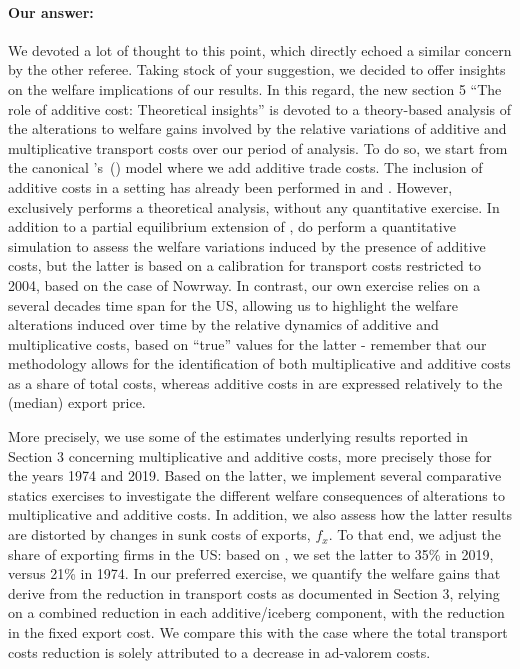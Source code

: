 \documentclass[a4paper,11pt]{article}
\newcommand\cites[1]{\citeauthor{#1}'s\ (\citeyear{#1})}
\begin{document}
\paragraph{Our answer:}
\noindent We devoted a lot of thought to this point, which directly echoed a similar concern by the other referee. Taking stock of your suggestion, we decided to offer insights on the welfare implications of our results. In this regard, the new section 5 ``The role of additive cost: Theoretical insights'' is devoted to a theory-based analysis of the alterations to welfare gains involved by the relative variations of additive and multiplicative transport costs over our period of analysis. To do so, we start from the canonical \cites{melitz} model where we add additive trade costs. The inclusion of additive costs in a \citet{melitz} setting has already been performed in \citet{sorensen2014} and \citet{Irrazabal_2015}. However, \citet{sorensen2014} exclusively performs a theoretical analysis, without any quantitative exercise. In addition to a partial equilibrium extension of \citet{melitz}, \citet{Irrazabal_2015} do perform a quantitative simulation to assess the welfare variations induced by the presence of additive costs, but the latter is based on a calibration for transport costs restricted to 2004, based on the case of Nowrway. In contrast, our own exercise relies on a several decades time span for the US, allowing us to highlight the welfare alterations induced over time by the relative dynamics of additive and multiplicative costs, based on ``true'' values for the latter - remember that our methodology allows for the identification of both multiplicative and additive costs as a share of total costs, whereas additive costs in \citet{Irrazabal_2015} are expressed relatively to the (median) export price.

More precisely, we use some of the estimates underlying results reported in Section 3 concerning multiplicative and additive costs, more precisely those for the years 1974 and 2019. Based on the latter, we implement several comparative statics exercises to investigate the different welfare consequences of alterations to multiplicative and additive costs. In addition, we also assess how the latter results are distorted by changes in sunk costs of exports, $f_{x}$. To that end, we adjust the share of exporting firms in the US: based on \citet{Lincoln_McCallum2018}, we set the latter to 35\% in 2019, versus 21\% in 1974. In our preferred exercise, we quantify the welfare gains that derive from the reduction in transport costs as documented in Section 3, relying on a combined reduction in each additive/iceberg component, with the reduction in the fixed export cost. We compare this with the case where the total transport costs reduction is solely attributed to a decrease in ad-valorem costs.
\end{document}
